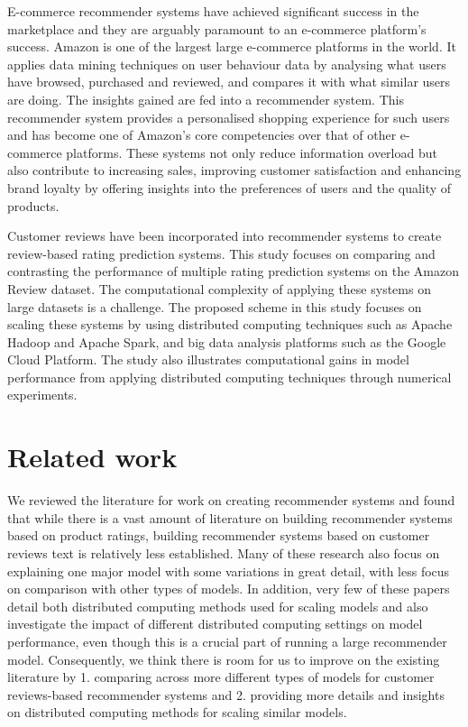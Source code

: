 \documentclass[sigconf,authorversion,nonacm]{acmart}
\begin{document}
    E-commerce recommender systems have achieved significant success in the marketplace and they are arguably paramount to an e-commerce platform's success. Amazon is one of the largest large e-commerce platforms in the world. It applies data mining techniques on user behaviour data by analysing what users have browsed, purchased and reviewed, and compares it with what similar users are doing\cite{krysik_2021}. The insights gained are fed into a recommender system. This recommender system provides a personalised shopping experience for such users and has become one of Amazon's core competencies over that of other e-commerce platforms. These systems not only reduce information overload but also contribute to increasing sales, improving customer satisfaction and enhancing brand loyalty by offering insights into the preferences of users and the quality of products. 

    Customer reviews have been incorporated into recommender systems to create review-based rating prediction systems. This study focuses on comparing and contrasting the performance of multiple rating prediction systems on the Amazon Review dataset. The computational complexity of applying these systems on large datasets is a challenge. The proposed scheme in this study focuses on scaling these systems by using distributed computing techniques such as Apache Hadoop and Apache Spark, and big data analysis platforms such as the Google Cloud Platform. The study also illustrates computational gains in model performance from applying distributed computing techniques through numerical experiments. 
    
\section{Related work}
    We reviewed the literature for work on creating recommender systems and found that while there is a vast amount of literature on building recommender systems based on product ratings, building recommender systems based on customer reviews text is relatively less established. Many of these research also focus on explaining one major model with some variations in great detail, with less focus on comparison with other types of models. In addition, very few of these papers detail both distributed computing methods used for scaling models and also investigate the impact of different distributed computing settings on model performance, even though this is a crucial part of running a large recommender model. Consequently, we think there is room for us to improve on the existing literature by 1. comparing across more different types of models for customer reviews-based recommender systems and 2. providing more details and insights on distributed computing methods for scaling similar models. 
\end{document}
